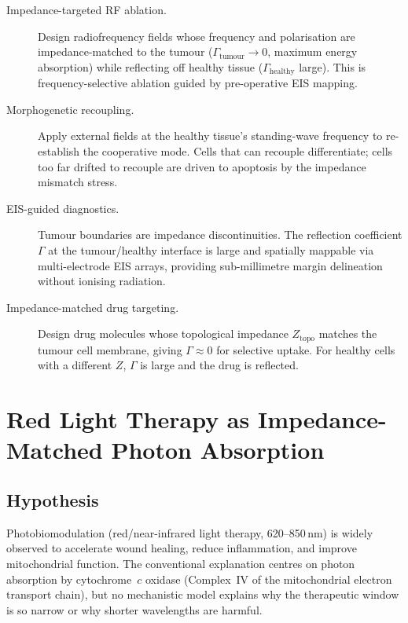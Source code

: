 \begin{description}
  \item[Impedance-targeted RF ablation.]
    Design radiofrequency fields whose frequency and polarisation
    are impedance-matched to the tumour ($\Gamma_{\mathrm{tumour}}
    \to 0$, maximum energy absorption) while reflecting off healthy
    tissue ($\Gamma_{\mathrm{healthy}}$ large).  This is
    frequency-selective ablation guided by pre-operative EIS mapping.

  \item[Morphogenetic recoupling.]
    Apply external fields at the healthy tissue's standing-wave
    frequency to re-establish the cooperative mode.  Cells that can
    recouple differentiate; cells too far drifted to recouple are
    driven to apoptosis by the impedance mismatch stress.

  \item[EIS-guided diagnostics.]
    Tumour boundaries are impedance discontinuities.  The reflection
    coefficient $\Gamma$ at the tumour/healthy interface is large
    and spatially mappable via multi-electrode EIS arrays, providing
    sub-millimetre margin delineation without ionising radiation.

  \item[Impedance-matched drug targeting.]
    Design drug molecules whose topological impedance
    $Z_{\mathrm{topo}}$ matches the tumour cell membrane, giving
    $\Gamma \approx 0$ for selective uptake.  For healthy cells with
    a different $Z$, $\Gamma$ is large and the drug is reflected.
\end{description}


\section{Red Light Therapy as Impedance-Matched Photon Absorption}
\label{sec:red_light_therapy}

\subsection{Hypothesis}

Photobiomodulation (red/near-infrared light therapy, 620--850\,nm)
is widely observed to accelerate wound healing, reduce inflammation,
and improve mitochondrial function.  The conventional explanation
centres on photon absorption by cytochrome~$c$ oxidase (Complex~IV
of the mitochondrial electron transport chain), but no mechanistic
model explains why the therapeutic window is so narrow or why
shorter wavelengths are harmful.

